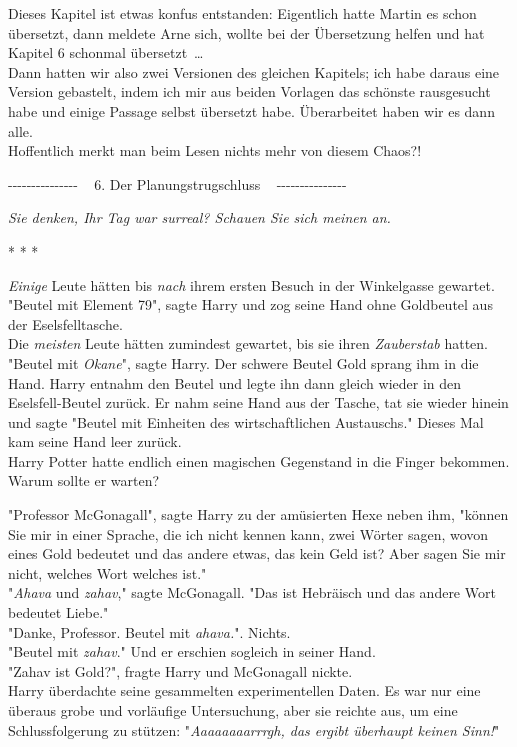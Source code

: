 

\hypertarget{der-planungstrugschluss}{%

Dieses Kapitel ist etwas konfus entstanden: Eigentlich hatte Martin es schon übersetzt, dann meldete Arne sich, wollte bei der Übersetzung helfen und hat Kapitel 6 schonmal übersetzt~…\\ Dann hatten wir also zwei Versionen des gleichen Kapitels; ich habe daraus eine Version gebastelt, indem ich mir aus beiden Vorlagen das schönste rausgesucht habe und einige Passage selbst übersetzt habe. Überarbeitet haben wir es dann alle.\\ Hoffentlich merkt man beim Lesen nichts mehr von diesem Chaos?!

-\/-\/-\/-\/-\/-\/-\/-\/-\/-\/-\/-\/-\/-\/- ~ 6. Der Planungstrugschluss ~ -\/-\/-\/-\/-\/-\/-\/-\/-\/-\/-\/-\/-\/-\/-

\emph{Sie denken, Ihr Tag war surreal? Schauen Sie sich meinen an.}

* * *

\emph{Einige} Leute hätten bis \emph{nach} ihrem ersten Besuch in der Winkelgasse gewartet.\\ "Beutel mit Element 79", sagte Harry und zog seine Hand ohne Goldbeutel aus der Eselsfelltasche.\\ Die \emph{meisten} Leute hätten zumindest gewartet, bis sie ihren \emph{Zauberstab} hatten.\\ "Beutel mit \emph{Okane}", sagte Harry. Der schwere Beutel Gold sprang ihm in die Hand. Harry entnahm den Beutel und legte ihn dann gleich wieder in den Eselsfell-Beutel zurück. Er nahm seine Hand aus der Tasche, tat sie wieder hinein und sagte "Beutel mit Einheiten des wirtschaftlichen Austauschs." Dieses Mal kam seine Hand leer zurück.\\ Harry Potter hatte endlich einen magischen Gegenstand in die Finger bekommen. Warum sollte er warten?

"Professor McGonagall", sagte Harry zu der amüsierten Hexe neben ihm, "können Sie mir in einer Sprache, die ich nicht kennen kann, zwei Wörter sagen, wovon eines Gold bedeutet und das andere etwas, das kein Geld ist? Aber sagen Sie mir nicht, welches Wort welches ist."\\ "\emph{Ahava} und \emph{zahav}," sagte McGonagall. "Das ist Hebräisch und das andere Wort bedeutet Liebe."\\ "Danke, Professor. Beutel mit \emph{ahava.}". Nichts.\\ "Beutel mit \emph{zahav}." Und er erschien sogleich in seiner Hand.\\ "Zahav ist Gold?", fragte Harry und McGonagall nickte.\\ Harry überdachte seine gesammelten experimentellen Daten. Es war nur eine überaus grobe und vorläufige Untersuchung, aber sie reichte aus, um eine Schlussfolgerung zu stützen: "\emph{Aaaaaaaarrrgh, das ergibt überhaupt keinen Sinn!}"

}

